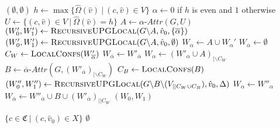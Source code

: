 \begin{algorithm}
	\caption{$\textsc{RecursiveUPGLocal}(\textit{parity game } G = (\\
		V \subseteq \mathfrak{C} \times \hat{V},\\
		\hat{V}_0 \subseteq \hat{V},\\
		\hat{V}_1 \subseteq \hat{V},\\
		E \subseteq (\mathfrak{C} \times \hat{V}) \times (\mathfrak{C} \times \hat{V}),\\
		\hat{\Omega} : \hat{V} \rightarrow \mathbb{N}),\\
		\hat{v}_0 \in \hat{V},\\
		\Delta \subseteq \{ 0,1\})$}
	\label{alg_zlnk_collective_local}
	\begin{multicols}{2}
		\begin{algorithmic}[1]
			\State \Return $(\emptyset,\emptyset)$
			\EndIf
			\State $h \gets\max\{ \hat{\Omega}(\hat{v})\ |\ (c,\hat{v}) \in V\}$
			\State $\alpha \gets 0$ if $h$ is even and $1$ otherwise
			\State $U \gets \{(c,\hat{v}) \in V\ |\ \hat{\Omega}(\hat{v}) = h\}$
			\State $A \gets \alpha\textit{-Attr}(G, U)$
			\If{$\overline{\alpha} \in \Delta$}
			\State $(W_0', W_1') \gets \textsc{RecursiveUPGLocal}(G \backslash A,\hat{v}_0,\{\overline{\alpha}\})$
			\Else
			\State $(W_0', W_1') \gets \textsc{RecursiveUPGLocal}(G \backslash A,\hat{v}_0,\emptyset)$
			\EndIf
			\label{line:recursiveUPGLocal:wopponentisempty}
			\State $W_\alpha \gets A \cup W_\alpha'$
			\State $W_{\overline{\alpha}} \gets \emptyset$
			\Else
				\State $C_W \gets \textsc{LocalConfs}(W'_{\overline{\alpha}})$
				\label{line:recursiveUPGLocal:wopponentwithoutCWisempty}
					\State $W_{\overline{\alpha}} \gets W'_{\overline{\alpha}}$
					\State $W_\alpha \gets (W'_\alpha \cup A)_{|\backslash C_W}$
				\Else
				\State $B \gets \overline{\alpha}\textit{-Attr}(G, (W'_{\overline{\alpha}})_{|\backslash C_W})$
				\State $C_B \gets \textsc{LocalConfs}(B)$
				\State $(W_0'', W_1'') \gets \textsc{RecursiveUPGLocal}(G \backslash B\backslash (V_{|| C_W \cup C_B}), \hat{v}_0, \Delta)$
				\State $W_\alpha \gets W''_\alpha$
				\State $W_{\overline{\alpha}} \gets W''_{\overline{\alpha}} \cup B \cup (W'_{\overline{\alpha}})_{||C_W}$
				\EndIf
			\EndIf
			\State \Return $(W_0, W_1)$
		\end{algorithmic}\bigskip\bigskip\bigskip\bigskip\bigskip\bigskip\bigskip\bigskip\bigskip\bigskip\bigskip\bigskip\bigskip\bigskip\bigskip\bigskip\bigskip\bigskip\bigskip\bigskip\bigskip\bigskip\bigskip\bigskip\bigskip\bigskip
		\begin{algorithmic}[1]
			\If{$\overline{\alpha} \in \Delta$}
				\State \Return $\{ c \in \mathfrak{C}\ |\ (c, \hat{v}_0) \in X \}$
			\Else
				\State \Return $\emptyset$
			\EndIf
			\EndFunction
		\end{algorithmic}
	\end{multicols}
\end{algorithm}

